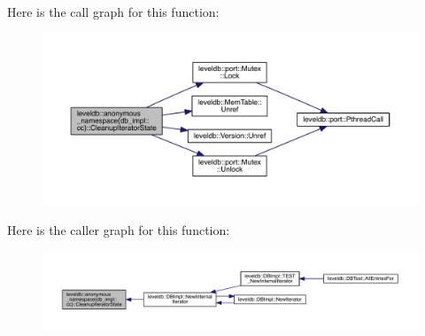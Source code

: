 Here is the call graph for this function\+:
\nopagebreak
\begin{figure}[H]
\begin{center}
\leavevmode
\includegraphics[width=350pt]{namespaceleveldb_1_1anonymous__namespace_02db__impl_8cc_03_a93de15836464fb02165b04f8439916d0_cgraph}
\end{center}
\end{figure}




Here is the caller graph for this function\+:
\nopagebreak
\begin{figure}[H]
\begin{center}
\leavevmode
\includegraphics[width=350pt]{namespaceleveldb_1_1anonymous__namespace_02db__impl_8cc_03_a93de15836464fb02165b04f8439916d0_icgraph}
\end{center}
\end{figure}


